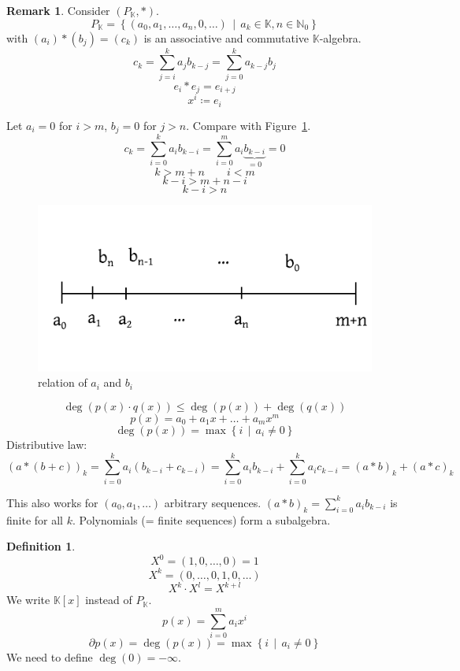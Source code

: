 \documentclass[a4paper,landscape,twocolumn]{article}
\newcommand\setdef[2]{\left\{#1\,\middle|\,#2\right\}}
\theoremstyle{definition}
\newtheorem{defi}{Definition}
\newtheorem{rem}{Remark}
\begin{document}
\begin{rem}
  Consider $(P_{\mathbb K}, *)$.
  \[ P_{\mathbb K} = \setdef{(a_0, a_1, \ldots, a_n, 0, \ldots)}{a_k \in \mathbb K, n \in \mathbb N_0} \]
  with $(a_i) * (b_j) = (c_k)$ is an associative and commutative $\mathbb K$-algebra.
  \[ c_k = \sum_{j=i}^k a_j b_{k-j} = \sum_{j=0}^k a_{k-j} b_j \]
  \[ e_i * e_j = e_{i+j} \]
  \[ x^i \coloneqq e_i \]

  Let $a_i = 0$ for $i > m$, $b_j = 0$ for $j > n$.
  Compare with Figure~\ref{img:inf-abi}.
  \[ c_k = \sum_{i=0}^k a_i b_{k-i} = \sum_{i=0}^m a_i \underbrace{b_{k-i}}_{=0} = 0 \]
  \[ k > m + n  \qquad i < m \]
  \[ k - i > m + n - i \]
  \[ k - i > n \]

  \begin{figure}[!h]
    \begin{center}
      \includegraphics{img/polynomial_k-algebra.pdf}
      \caption{relation of $a_i$ and $b_i$}
      \label{img:inf-abi}
    \end{center}
  \end{figure}

  \[ \deg(p(x) \cdot q(x)) \leq \deg(p(x)) + \deg(q(x)) \]
  \[ p(x) = a_0 + a_1 x + \ldots + a_m x^m \]
  \[ \deg(p(x)) = \max\setdef{i}{a_i \neq 0} \]
  Distributive law:
  \[ (a * (b + c))_k = \sum_{i=0}^k a_i (b_{k-i} + c_{k-i}) = \sum_{i=0}^k a_i b_{k-i} + \sum_{i=0}^k a_i c_{k-i} = (a * b)_k + (a * c)_k \]

  This also works for $(a_0, a_1, \ldots)$ arbitrary sequences.
  $(a * b)_k = \sum_{i=0}^k a_i b_{k-i}$ is finite for all $k$.
  Polynomials (= finite sequences) form a subalgebra.
\end{rem}

\begin{defi}
  \label{defi-9.6}
  \[ X^0 = (1, 0, \ldots, 0) = 1 \]
  \[ X^k = (0, \ldots, 0, 1, 0, \ldots) \]
  \[ X^k \cdot X^l = X^{k+l} \]
  We write $\mathbb K[x]$ instead of $P_{\mathbb K}$.
  \[ p(x) = \sum_{i=0}^m a_i x^i \]
  \[ \partial p(x) = \deg(p(x)) = \max\setdef{i}{a_i \neq 0} \]
  We need to define $\deg(0) = -\infty$.
\end{defi}
\end{document}
